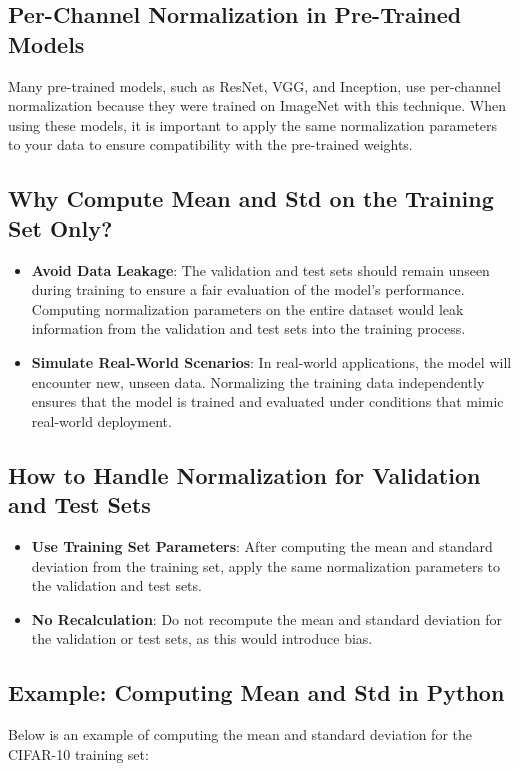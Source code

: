 \begin{notechapter}
\section{Per-Channel Normalization in Pre-Trained Models}
Many pre-trained models, such as ResNet, VGG, and Inception, use
per-channel normalization because they were trained on ImageNet with
this technique. When using these models, it is important to apply
the same normalization parameters to your data to ensure compatibility
with the pre-trained weights.

\subsection{Why Compute Mean and Std on the Training Set Only?}
\begin{itemize}
    \item \textbf{Avoid Data Leakage}: The validation and test sets
          should remain unseen during training to ensure a fair
          evaluation of the model's performance. Computing
          normalization parameters on the entire dataset would leak
          information from the validation and test sets into the
          training process.
    \item \textbf{Simulate Real-World Scenarios}: In real-world
          applications, the model will encounter new, unseen data.
          Normalizing the training data independently ensures that
          the model is trained and evaluated under conditions that
          mimic real-world deployment.
\end{itemize}

\subsection{How to Handle Normalization for Validation and Test Sets}
\begin{itemize}
    \item \textbf{Use Training Set Parameters}: After computing the
          mean and standard deviation from the training set, apply
          the same normalization parameters to the validation and
          test sets.
    \item \textbf{No Recalculation}: Do not recompute the mean and
          standard deviation for the validation or test sets, as
          this would introduce bias.
\end{itemize}

\subsection{Example: Computing Mean and Std in Python}
Below is an example of computing the mean and standard deviation
for the CIFAR-10 training set:


\end{notechapter}
